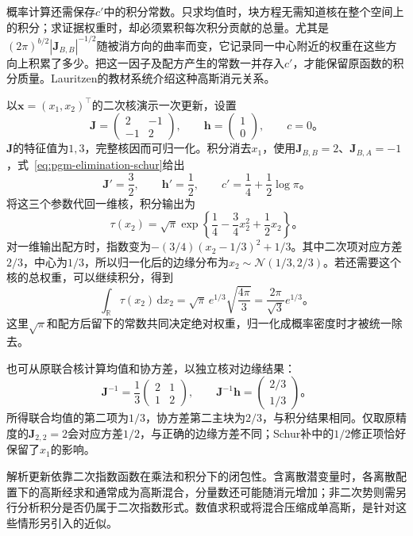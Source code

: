 概率计算还需保存$c'$中的积分常数。只求均值时，块方程无需知道核在整个空间上的积分；求证据权重时，却必须累积每次积分贡献的总量。尤其是$(2\pi)^{b/2}|\bm{J}_{B,B}|^{-1/2}$随被消方向的曲率而变，它记录同一中心附近的权重在这些方向上积累了多少。把这一因子及配方产生的常数一并存入$c'$，才能保留原函数的积分质量。Lauritzen的教材系统介绍这种高斯消元关系。

\begin{example}[一个二维高斯核的积分]
  \label{ex:pgm-elimination-gaussian-numeric}
  以$\bm{x}=(x_1,x_2)^{\top}$的二次核演示一次更新，设置
  \[
    \bm{J}=\begin{pmatrix}2&-1\\-1&2\end{pmatrix},
    \qquad
    \bm{h}=\begin{pmatrix}1\\0\end{pmatrix},
    \qquad c=0
    \text{。}
  \]
  $\bm{J}$的特征值为$1,3$，完整核因而可归一化。积分消去$x_1$，使用$\bm{J}_{B,B}=2$、$\bm{J}_{B,A}=-1$，式~\eqref{eq:pgm-elimination-schur}给出
  \[
    \bm{J}'=\frac32,\qquad \bm{h}'=\frac12,\qquad
    c'=\frac14+\frac12\log\pi
    \text{。}
  \]
  将这三个参数代回一维核，积分输出为
  \[
    \tau(x_2)=\sqrt{\pi}\exp\!\left\{
      \frac14-\frac34x_2^2+\frac12x_2\right\}
      \text{。}
  \]
  对一维输出配方时，指数变为$-(3/4)(x_2-1/3)^2+1/3$。其中二次项对应方差$2/3$，中心为$1/3$，所以归一化后的边缘分布为$x_2\sim\mathcal{N}(1/3,2/3)$。若还需要这个核的总权重，可以继续积分，得到
  \[
    \int_{\mathbb{R}}\tau(x_2)\,\mathrm{d}x_2
    =\sqrt{\pi}\,e^{1/3}\sqrt{\frac{4\pi}{3}}
    =\frac{2\pi}{\sqrt{3}}e^{1/3}
    \text{。}
  \]
  这里$\sqrt{\pi}$和配方后留下的常数共同决定绝对权重，归一化成概率密度时才被统一除去。

  也可从原联合核计算均值和协方差，以独立核对边缘结果：
  \[
    \bm{J}^{-1}=\frac13
      \begin{pmatrix}2&1\\1&2\end{pmatrix},
    \qquad
    \bm{J}^{-1}\bm{h}=
      \begin{pmatrix}2/3\\1/3\end{pmatrix}
      \text{。}
  \]
  所得联合均值的第二项为$1/3$，协方差第二主块为$2/3$，与积分结果相同。仅取原精度的$\bm{J}_{2,2}=2$会对应方差$1/2$，与正确的边缘方差不同；Schur补中的$1/2$修正项恰好保留了$x_1$的影响。
\end{example}

解析更新依靠二次指数函数在乘法和积分下的闭包性。含离散潜变量时，各离散配置下的高斯经求和通常成为高斯混合，分量数还可能随消元增加；非二次势则需另行分析积分是否仍属于二次指数形式。数值求积或将混合压缩成单高斯，是针对这些情形另引入的近似。

